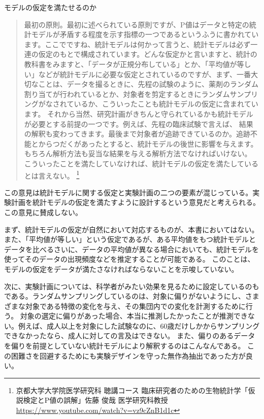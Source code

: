 \begin{SMbox}{モデルの仮定を満たせるのか}
    \ 
    \begin{quote}
    最初の原則。最初に述べられている原則ですが、P値はデータと特定の統計モデルが矛盾する程度を示す指標の一つであるというふうに書かれています。ここでですね、統計モデルは何かって言うと、統計モデルは必ず一連の仮定のもとで構成されています。どんな仮定かと言いますと、統計の教科書をみますと、「データが正規分布している」とか、「平均値が等しい」などが統計モデルに必要な仮定とされているのですが、まず、一番大切なことは、データを撮るときに、先程の試験のように、薬剤のランダム割り当てが行われているとか、対象者を剪定するときにランダムサンプリングがなされているか、こういったことも統計モデルの仮定に含まれています。
    それから当然、研究計画がきちんと守られているかも統計モデルが必要とする前提の一つです。例えば、先程の臨床試験で言えば、
    結果の解釈も変わってきます。最後まで対象者が追跡できているのか。追跡不能とからつだくがあったとすると、統計モデルの後世に影響を与えます。もちろん解析方法も妥当な結果を与える解析方法でなければいけない。
    こういったことを満たしていなければ、統計モデルの仮定を満たしているとは言えない。
    \footnote{京都大学大学院医学研究科 聴講コース 臨床研究者のための生物統計学「仮説検定とP値の誤解」佐藤 俊哉 医学研究科教授 \url{https://www.youtube.com/watch?v=vz9cZnB1d1c} }
    \end{quote}

    この意見は統計モデルに関する仮定と実験計画の二つの要素が混じっている。実験計画を統計モデルの仮定を満たすように設計するという意見だと考えられる。
    この意見に賛成しない。

     まず、統計モデルの仮定が自然において対応するものが、本書においてはない。また、「平均値が等しい」という仮定であるが、ある平均値をもつ統計モデルとデータを比べるさいに、データの平均値が異なる場合においても、統計モデルを使ってそのデータの出現頻度などを推定することが可能である。
     このことは、モデルの仮定をデータが満たさなければならないことを示唆していない。

     次に、実験計画については、科学者がみたい効果を見るために設定しているのもである。ランダムサンプリングしているのは、対象に偏りがないようにし、さまざまな対象である特徴の変化を与え、その集団内での変化を計測するために行う。
     対象の選定に偏りがあった場合、本当に推測したかったことが推測できない。例えば、成人以上を対象にした試験なのに、60歳だけしかからサンプリングできなかったなら、成人に対しての言及はできない。
     また、偏りのあるデータを偏りを前提としていない統計モデルにより解釈するのはこんなんである。
     この困難さを回避するためにも実験デザインを守った無作為抽出であった方が良い。
     


\end{SMbox}




